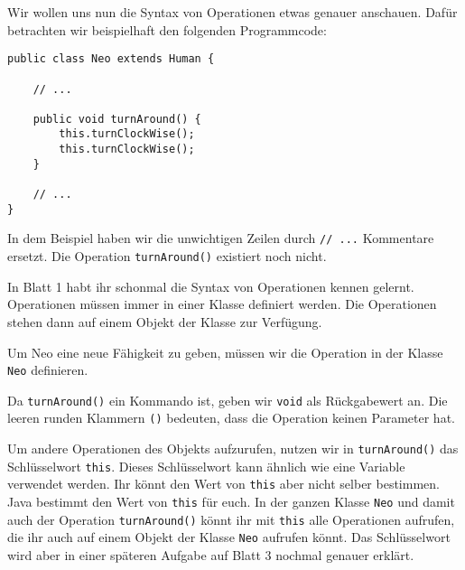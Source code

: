 \begin{Infobox}
    Wir wollen uns nun die Syntax von Operationen etwas genauer anschauen. 
    Dafür betrachten wir beispielhaft den folgenden Programmcode:

    \begin{lstlisting}[numbers=none]
public class Neo extends Human {

    // ...

    public void turnAround() {
        this.turnClockWise();
        this.turnClockWise();
    }

    // ...
}
    \end{lstlisting}

    In dem Beispiel haben wir die unwichtigen Zeilen durch \lstinline{// ...} Kommentare ersetzt.
    Die Operation \lstinline{turnAround()} existiert noch nicht.

    In Blatt 1 habt ihr schonmal die Syntax von Operationen kennen gelernt.
    Operationen müssen immer in einer Klasse definiert werden.
    Die Operationen stehen dann auf einem Objekt der Klasse zur Verfügung.

    Um Neo eine neue Fähigkeit zu geben, müssen wir die Operation in der Klasse \lstinline{Neo} definieren.

    Da \lstinline{turnAround()} ein Kommando ist, geben wir \lstinline{void} als Rückgabewert an.
    Die leeren runden Klammern \lstinline{()} bedeuten, dass die Operation keinen Parameter hat.

    Um andere Operationen des Objekts aufzurufen, nutzen wir in \lstinline{turnAround()} das Schlüsselwort \lstinline{this}.
    Dieses Schlüsselwort kann ähnlich wie eine Variable verwendet werden.
    Ihr könnt den Wert von \lstinline{this} aber nicht selber bestimmen.
    Java bestimmt den Wert von \lstinline{this} für euch.
    In der ganzen Klasse \lstinline{Neo} und damit auch der Operation \lstinline{turnAround()} könnt ihr mit \lstinline{this} alle Operationen aufrufen, die ihr auch auf einem Objekt der Klasse \lstinline{Neo} aufrufen könnt.
    Das Schlüsselwort wird aber in einer späteren Aufgabe auf Blatt 3 nochmal genauer erklärt.

\end{Infobox}


